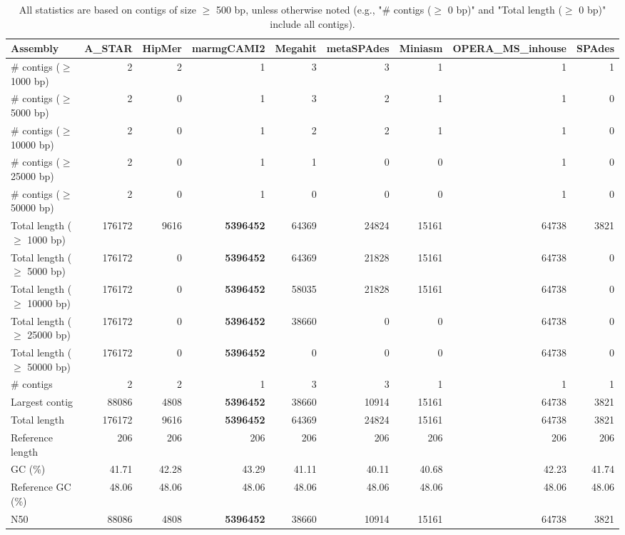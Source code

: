 \documentclass[12pt,a4paper]{article}
\begin{document}
\begin{table}[ht]
\begin{center}
\caption{All statistics are based on contigs of size $\geq$ 500 bp, unless otherwise noted (e.g., "\# contigs ($\geq$ 0 bp)" and "Total length ($\geq$ 0 bp)" include all contigs).}
\begin{tabular}{|l*{8}{|r}|}
\hline
Assembly & A\_STAR & HipMer & marmgCAMI2 & Megahit & metaSPAdes & Miniasm & OPERA\_MS\_inhouse & SPAdes \\ \hline
\# contigs ($\geq$ 1000 bp) & 2 & 2 & 1 & 3 & 3 & 1 & 1 & 1 \\ \hline
\# contigs ($\geq$ 5000 bp) & 2 & 0 & 1 & 3 & 2 & 1 & 1 & 0 \\ \hline
\# contigs ($\geq$ 10000 bp) & 2 & 0 & 1 & 2 & 2 & 1 & 1 & 0 \\ \hline
\# contigs ($\geq$ 25000 bp) & 2 & 0 & 1 & 1 & 0 & 0 & 1 & 0 \\ \hline
\# contigs ($\geq$ 50000 bp) & 2 & 0 & 1 & 0 & 0 & 0 & 1 & 0 \\ \hline
Total length ($\geq$ 1000 bp) & 176172 & 9616 & {\bf 5396452} & 64369 & 24824 & 15161 & 64738 & 3821 \\ \hline
Total length ($\geq$ 5000 bp) & 176172 & 0 & {\bf 5396452} & 64369 & 21828 & 15161 & 64738 & 0 \\ \hline
Total length ($\geq$ 10000 bp) & 176172 & 0 & {\bf 5396452} & 58035 & 21828 & 15161 & 64738 & 0 \\ \hline
Total length ($\geq$ 25000 bp) & 176172 & 0 & {\bf 5396452} & 38660 & 0 & 0 & 64738 & 0 \\ \hline
Total length ($\geq$ 50000 bp) & 176172 & 0 & {\bf 5396452} & 0 & 0 & 0 & 64738 & 0 \\ \hline
\# contigs & 2 & 2 & 1 & 3 & 3 & 1 & 1 & 1 \\ \hline
Largest contig & 88086 & 4808 & {\bf 5396452} & 38660 & 10914 & 15161 & 64738 & 3821 \\ \hline
Total length & 176172 & 9616 & {\bf 5396452} & 64369 & 24824 & 15161 & 64738 & 3821 \\ \hline
Reference length & 206 & 206 & 206 & 206 & 206 & 206 & 206 & 206 \\ \hline
GC (\%) & 41.71 & 42.28 & 43.29 & 41.11 & 40.11 & 40.68 & 42.23 & 41.74 \\ \hline
Reference GC (\%) & 48.06 & 48.06 & 48.06 & 48.06 & 48.06 & 48.06 & 48.06 & 48.06 \\ \hline
N50 & 88086 & 4808 & {\bf 5396452} & 38660 & 10914 & 15161 & 64738 & 3821 \\ \hline

\end{tabular}
\end{center}
\end{table}
\end{document}
